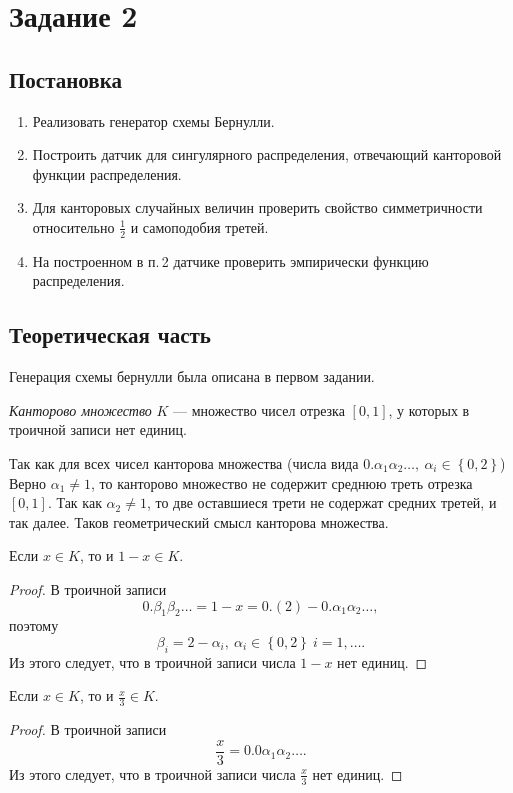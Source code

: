 \documentclass[12pt, a4paper]{article}
\begin{document}
\newpage

\section{Задание 2}
\subsection{Постановка}
\begin{enumerate}
\item Реализовать генератор схемы Бернулли.
\item Построить датчик для сингулярного распределения, отвечающий канторовой функции распределения.
\item Для канторовых случайных величин проверить свойство симметричности относительно $\frac 12$ и самоподобия третей.
\item На построенном в п.\,2 датчике проверить эмпирически функцию распределения.
\end{enumerate}

\subsection{Теоретическая часть}
Генерация схемы бернулли была описана в первом задании.

\begin{df}
\textit{Канторово множество} $K$ --- множество чисел отрезка $[0,1]$, у которых в троичной записи нет единиц. 
\end{df}
Так как для всех чисел канторова множества (числа вида $0.\alpha_1\alpha_2\ldots,\ \alpha_i \in \left\{ 0,2\right\}$) Верно $\alpha_1\ne 1$, то канторово множество не содержит среднюю треть отрезка $[0,1]$. Так как $\alpha_2\ne 1$, то две оставшиеся трети не содержат средних третей, и так далее. Таков геометрический смысл канторова множества.

\begin{theorem}
Если $x\in K$, то и $1-x \in K$.
\end{theorem}
\begin{proof}
В троичной записи \[0.\beta_1\beta_2\ldots = 1-x = 0.(2) - 0.\alpha_1\alpha_2\ldots, \] 
поэтому \[\beta_i = 2 - \alpha_i,\ \alpha_i\in\left\{0,2\right\}\  i=1,\ldots.\]
Из этого следует, что в троичной записи числа $1-x$ нет единиц.
\end{proof}

\begin{theorem}
Если $x\in K$, то и $\frac x3 \in K$.
\end{theorem}
\begin{proof}
В троичной записи \[\frac{x}{3} =0.0\alpha_1\alpha_2\ldots. \]
Из этого следует, что в троичной записи числа $\frac x3$ нет единиц.
\end{proof}	
\end{document}
